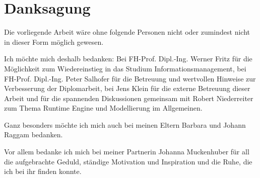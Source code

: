 \section*{Danksagung}

Die vorliegende Arbeit wäre ohne folgende Personen nicht oder zumindest nicht in dieser Form möglich gewesen.

Ich möchte mich deshalb bedanken: Bei FH-Prof. Dipl.-Ing. Werner Fritz für die Möglichkeit zum Wiedereinstieg in das Studium Informationsmanagement, bei FH-Prof. Dipl.-Ing. Peter Salhofer für die Betreuung und wertvollen Hinweise zur Verbesserung der Diplomarbeit, bei Jens Klein für die externe Betreuung dieser Arbeit und für die spannenden Diskussionen gemeinsam mit Robert Niederreiter zum Thema Runtime Engine und Modellierung im Allgemeinen.

Ganz besonders möchte ich mich auch bei meinen Eltern Barbara und Johann Raggam bedanken.

Vor allem bedanke ich mich bei meiner Partnerin Johanna Muckenhuber für all die aufgebrachte Geduld, ständige Motivation und Inspiration und die Ruhe, die ich bei ihr finden konnte.



